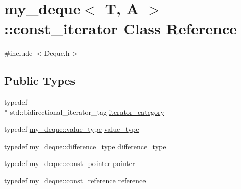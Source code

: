 \hypertarget{classmy__deque_1_1const__iterator}{\section{my\-\_\-deque$<$ T, A $>$\-:\-:const\-\_\-iterator Class Reference}
\label{classmy__deque_1_1const__iterator}
}


{\ttfamily \#include $<$Deque.\-h$>$}

\subsection*{Public Types}
\begin{DoxyCompactItemize}
\item 
typedef \\*
std\-::bidirectional\-\_\-iterator\-\_\-tag \hyperlink{classmy__deque_1_1const__iterator_a1a84b424e091e49a4af1c13a38621252}{iterator\-\_\-category}
\item 
typedef \hyperlink{classmy__deque_ae9c156c405acc57623a4601ce755596f}{my\-\_\-deque\-::value\-\_\-type} \hyperlink{classmy__deque_1_1const__iterator_adc8d08cb0b0a1dcb50323ba5ab8fdecb}{value\-\_\-type}
\item 
typedef \hyperlink{classmy__deque_ac85676cb2492fbc9bbc6f1a30e9d3c73}{my\-\_\-deque\-::difference\-\_\-type} \hyperlink{classmy__deque_1_1const__iterator_abe3b655aa980c8a12ba486058464c91d}{difference\-\_\-type}
\item 
typedef \hyperlink{classmy__deque_a8fea5edeb2b2cf3dd1246dc3abf9b71b}{my\-\_\-deque\-::const\-\_\-pointer} \hyperlink{classmy__deque_1_1const__iterator_a6a7d42610f3b7e55f38897c151862071}{pointer}
\item 
typedef \hyperlink{classmy__deque_ad50d8b378580088cf77fa43f0640e49c}{my\-\_\-deque\-::const\-\_\-reference} \hyperlink{classmy__deque_1_1const__iterator_a37cd7eef8e73e5a65d7a9d16ba6d3ed2}{reference}
\end{DoxyCompactItemize}
